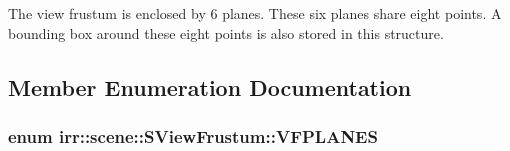 The view frustum is enclosed by 6 planes. These six planes share eight points. A bounding box around these eight points is also stored in this structure. 

\subsection{Member Enumeration Documentation}
\subsubsection[{\texorpdfstring{V\+F\+P\+L\+A\+N\+ES}{VFPLANES}}]{\setlength{\rightskip}{0pt plus 5cm}enum {\bf irr\+::scene\+::\+S\+View\+Frustum\+::\+V\+F\+P\+L\+A\+N\+ES}}\hypertarget{structirr_1_1scene_1_1SViewFrustum_ae3a96797aec028717f0589e82926b9f0}{}\label{structirr_1_1scene_1_1SViewFrustum_ae3a96797aec028717f0589e82926b9f0}
